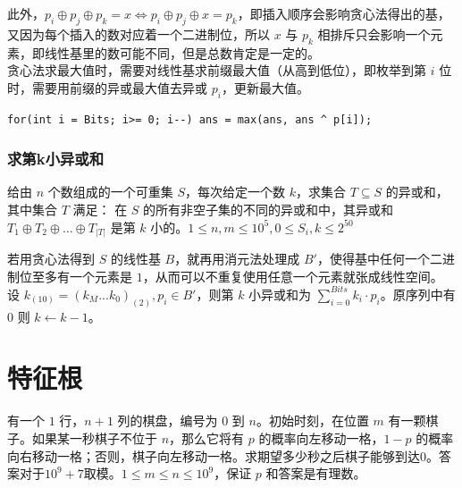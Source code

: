 \documentclass[12pt,a4paper]{article}
\begin{document}
此外，$p_i\oplus p_j\oplus p_k=x\iff p_i\oplus p_j\oplus x=p_k$，即插入顺序会影响贪心法得出的基，又因为每个插入的数对应着一个二进制位，所以 $x$ 与 $p_k$ 相排斥只会影响一个元素，即线性基里的数可能不同，但是总数肯定是一定的。\\
贪心法求最大值时，需要对线性基求前缀最大值（从高到低位），即枚举到第 $i$ 位时，需要用前缀的异或最大值去异或 $p_i$，更新最大值。
\begin{lstlisting}
for(int i = Bits; i>= 0; i--) ans = max(ans, ans ^ p[i]);
\end{lstlisting}

\subsubsection{求第k小异或和}
\begin{mdframed}[leftline=true, linewidth=2pt, linecolor=gray]
	给由 $n$ 个数组成的一个可重集 $S$，每次给定一个数 $k$，求集合 $T \subseteq S$ 的异或和，其中集合 $T$ 满足： 在 $S$ 的所有非空子集的不同的异或和中，其异或和 $T_1 \oplus T_2 \oplus \ldots \oplus T_{|T|}$ 是第 $k$ 小的。$1\le n,m\le 10^5,0\le S_i,k\le2^{50}$
\end{mdframed}
若用贪心法得到 $S$ 的线性基 $B$，就再用消元法处理成 $B'$，使得基中任何一个二进制位至多有一个元素是 $1$，从而可以不重复使用任意一个元素就张成线性空间。\\
设 $k_{(10)}=(k_M...k_0)_{(2)},p_i\in B'$，则第 $k$ 小异或和为 $\displaystyle\sum_{i=0}^{Bits}k_i\cdot p_i$。原序列中有 $0$ 则 $k\leftarrow k-1$。

\newpage
\section{特征根}
\begin{mdframed}[leftline=true, linewidth=2pt, linecolor=gray]
	有一个 $1$ 行，$n+1$ 列的棋盘，编号为 $0$ 到 $n$。初始时刻，在位置 $m$ 有一颗棋子。如果某一秒棋子不位于 $n$，那么它将有 $p$ 的概率向左移动一格，$1-p$ 的概率向右移动一格；否则，棋子向左移动一格。求期望多少秒之后棋子能够到达$0$。答案对于$10^9+7$取模。$1\le m\le n\le 10^9$，保证 $p$ 和答案是有理数。
\end{mdframed}
\end{document}
